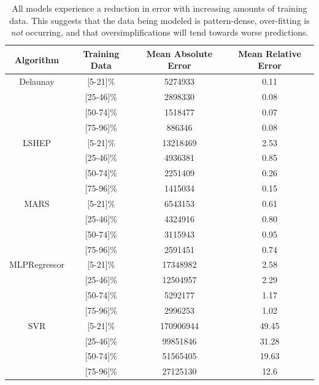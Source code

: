 \documentclass{scspaperproc}
\theoremstyle{scsthe}
\begin{document}
\begin{table}
  \centering
  \begin{tabular}{|c||c|c|c|}
    \hline
    \textbf{Algorithm} & \textbf{Training Data} & \textbf{Mean Absolute Error} & \textbf{Mean Relative Error}\\
    \hline
    Delaunay     & [5-21]\%  & 5274933   & 0.11 \\
                 & [25-46]\% & 2898330   & 0.08 \\
                 & [50-74]\% & 1518477   & 0.07 \\
                 & [75-96]\% & 886346    & 0.08 \\
    \hline
    LSHEP        & [5-21]\%  & 13218469  & 2.53 \\
                 & [25-46]\% & 4936381   & 0.85 \\
                 & [50-74]\% & 2251409   & 0.26 \\
                 & [75-96]\% & 1415034   & 0.15 \\
    \hline
    MARS         & [5-21]\%  & 6543153   & 0.61 \\
                 & [25-46]\% & 4324916   & 0.80 \\
                 & [50-74]\% & 3115943   & 0.95 \\
                 & [75-96]\% & 2591451   & 0.74 \\
    \hline
    MLPRegressor & [5-21]\%  & 17348982  & 2.58 \\
                 & [25-46]\% & 12504957  & 2.29 \\
                 & [50-74]\% & 5292177   & 1.17 \\
                 & [75-96]\% & 2996253   & 1.02 \\
    \hline
    SVR          & [5-21]\%  & 170906944 & 49.45\\
                 & [25-46]\% & 99851846  & 31.28\\
                 & [50-74]\% & 51565405  & 19.63\\
                 & [75-96]\% & 27125130  & 12.6 \\
    \hline
  \end{tabular}
  \caption{All models experience a reduction in error with increasing
    amounts of training data. This suggests that the data being
    modeled is pattern-dense, over-fitting is \textit{not} occurring,
    and that oversimplifications will tend towards worse predictions.}
  \label{tab:perf_by_tt}
\end{table}
\end{document}
